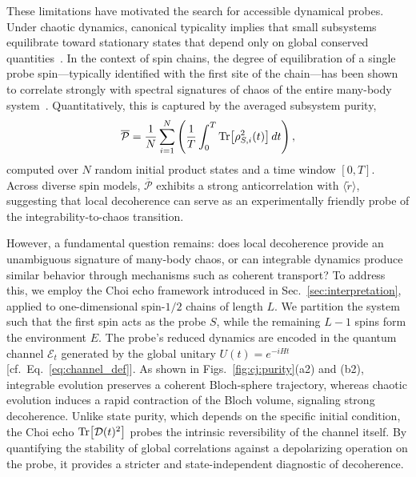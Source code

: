\documentclass[pra,twocolumn,aps,showpacs,superscriptaddress,longbibliography]{revtex4-2}
\begin{document}
These limitations have motivated the search for accessible dynamical probes. Under chaotic dynamics, canonical typicality implies that small subsystems equilibrate toward stationary states that depend only on global conserved quantities~\cite{goldstein_2006_canonical, rigol_2008_thermalization}. In the context of spin chains, the degree of equilibration of a single probe spin---typically identified with the first site of the chain---has been shown to correlate strongly with spectral signatures of chaos of the entire many-body system~\cite{mirkin_2021_quantum}. Quantitatively, this is captured by the averaged subsystem purity,
\begin{equation}\label{eq:avg:P}
\overline{\mathcal{P}}=\frac{1}{N}\sum_{i=1}^N
\left(\frac{1}{T}\int_0^T \Tr[\rho_{S,i}^2(t)]\,dt\right),
\end{equation}
computed over $N$ random initial product states and a time window $[0,T]$. Across diverse spin models, $\overline{\mathcal{P}}$ exhibits a strong anticorrelation with $\langle \tilde{r} \rangle$, suggesting that local decoherence can serve as an experimentally friendly probe of the integrability-to-chaos transition.

However, a fundamental question remains: does local decoherence provide an unambiguous signature of many-body chaos, or can integrable dynamics produce similar behavior through mechanisms such as coherent transport? To address this, we employ the Choi echo framework introduced in Sec.~\ref{sec:interpretation}, applied to one-dimensional spin-$1/2$ chains of length $L$. We partition the system such that the first spin acts as the probe $S$, while the remaining $L-1$ spins form the environment $E$. The probe’s reduced dynamics are encoded in the quantum channel $\mathcal{E}_t$ generated by the global unitary $U(t)=e^{-iHt}$ [cf.~Eq.~\eqref{eq:channel_def}]. As shown in Figs.~\ref{fig:cj:purity}(a2) and (b2), integrable evolution preserves a coherent Bloch-sphere trajectory, whereas chaotic evolution induces a rapid contraction of the Bloch volume, signaling strong decoherence. Unlike state purity, which depends on the specific initial condition, the Choi echo $\Tr[\mathcal{D}(t)^2]$ probes the intrinsic reversibility of the channel itself. By quantifying the stability of global correlations against a depolarizing operation on the probe, it provides a stricter and state-independent diagnostic of decoherence.
\end{document}
